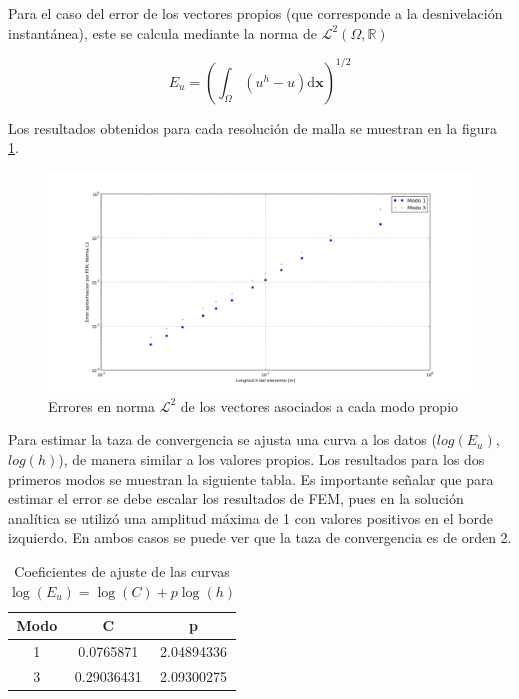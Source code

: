 Para el caso del error de los vectores propios (que corresponde a la desnivelaci\'on instant\'anea), este se calcula mediante la norma de $\mathcal{L}^2(\Omega,\mathbb{R})$

$$E_u = \left(\int_{\Omega} (u^h - u) \mathrm{d}\boldsymbol{x} \right)^{1/2}$$

Los resultados obtenidos para cada resoluci\'on de malla se muestran en la figura \ref{fig:vectores_propios}.

\begin{figure}
  \centering
  \includegraphics[width=17cm]{figuras/vectores_propiosFEM.png}
  \caption{Errores en norma $\mathcal{L}^2$ de los vectores asociados a cada modo propio}
  \label{fig:vectores_propios}
\end{figure}

Para estimar la taza de convergencia se ajusta una curva a los datos ($log(E_u)$, $log(h)$), de manera similar a los valores propios. Los resultados para los dos primeros modos se muestran la siguiente tabla. Es importante señalar que para estimar el error se debe escalar los resultados de FEM, pues en la soluci\'on anal\'itica se utiliz\'o una amplitud m\'axima de 1 con valores positivos en el borde izquierdo. En ambos casos se puede ver que la taza de convergencia es de orden 2.

\begin{table}
  \centering
  \begin{tabular}{|c|c|c|}
  \hline 
  Modo & C & p \\ 
  \hline 
  1 & 0.0765871 & 2.04894336 \\  
  \hline 
  3 & 0.29036431 & 2.09300275 \\  
  \hline 
  \end{tabular} 
  \caption{Coeficientes de ajuste de las curvas $\log(E_u)=\log(C)+p\log(h)$}
  \label{tabla:Eu}
\end{table}


